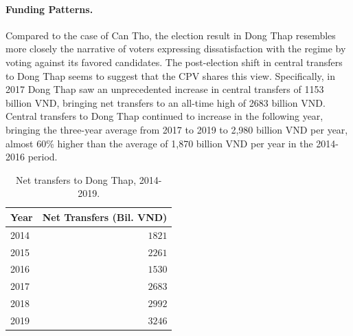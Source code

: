 \documentclass[12pt]{article}
\newcommand{\1}{\mathbbm{1}}
\begin{document}
\paragraph{Funding Patterns.} 

Compared to the case of Can Tho, the election result in Dong Thap resembles more closely the narrative of voters expressing dissatisfaction with the regime by voting against its favored candidates. The post-election shift in central transfers to Dong Thap seems to suggest that the CPV shares this view. Specifically, in 2017 Dong Thap saw an unprecedented increase in central transfers of 1153 billion VND, bringing net transfers to an all-time high of 2683 billion VND. Central transfers to Dong Thap continued to increase in the following year, bringing the three-year average from 2017 to 2019 to 2,980 billion VND per year, almost 60\% higher than the average of 1,870 billion VND per year in the 2014-2016 period.

\begin{table}[!htb]
	\centering
	\caption{Net transfers to Dong Thap, 2014-2019.}
	\label{tab:fund_DongThap}
	\begin{tabular}{@{}lr@{}}
		\toprule
		Year & \multicolumn{1}{c}{Net Transfers (Bil. VND)}  \\ \midrule
		2014 & $1821$                    \\
		2015 & $2261$                    \\
		2016 & $1530$                    \\ \midrule
		2017 & $2683$                    \\
		2018 & $2992$                   \\
		2019 & $3246$                    \\ \bottomrule
	\end{tabular}
\end{table}
\end{document}
